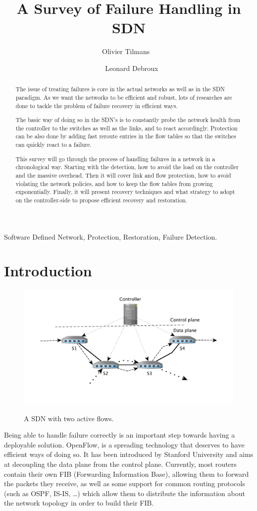\documentclass[]{IEEEtran}
\author{Olivier Tilmans ~\and~ Leonard Debroux \\
\IEEEauthorblockA{
  EPL, UCL\\
  Louvain-la-Neuve, Belgium\\
  \{leonard.debroux, olivier.tilmans\}@student.uclouvain.be
}}
\title{A Survey of Failure Handling in SDN}
\begin{document}
\maketitle
\begin{abstract}
The issue of treating failures is core in the actual networks as well as in the SDN paradigm. As we want the networks to be efficient and robust, lots of researches are done to tackle the problem of failure recovery in efficient ways.

The basic way of doing so in the SDN's is to constantly probe the network health from the controller to the switches as well as the links, and to react accordingly. Protection can be also done by adding fast reroute entries in the flow tables so that the switches can quickly react to a failure.

This survey will go through the process of handling failures in a network in a chronological way. Starting with the detection, how to avoid the load on the controller and the massive overhead. Then it will cover link and flow protection, how to avoid violating the network policies, and how to keep the flow tables from growing exponentially. Finally, it will present recovery techniques and what strategy to adopt on the controller-side to propose efficient recovery and restoration.
\end{abstract}

\begin{IEEEkeywords}
Software Defined Network, Protection, Restoration, Failure Detection.
\end{IEEEkeywords}

\section{Introduction}
\begin{figure}
	\includegraphics[width=.53\textwidth]{images/sdn.pdf}
	\label{fig:sdn}
	\caption{A SDN with two active flows.}
\end{figure}
Being able to handle failure correctly is an important step towards having a deployable solution. OpenFlow, is a spreading technology that deserves to have efficient ways of doing so. It has been introduced by Stanford University and aims at decoupling the data plane from the control plane. Currently, most routers contain their own FIB (Forwarding Information Base), allowing them to forward the packets they receive, as well as some support for common routing protocols (such as OSPF, IS-IS, \ldots) which allow them to distribute the information about the network topology in order to build their FIB.
\end{document}
